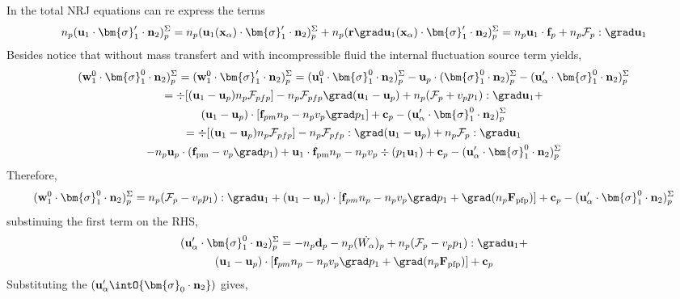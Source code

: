In the total NRJ equations can re express the terms 
\begin{multline*}
    n_p (\textbf{u}_1 \cdot \bm{\sigma}_1' \cdot  \textbf{n}_2)^\Sigma_p
    = 
    n_p (\textbf{u}_1(\textbf{x}_\alpha) \cdot \bm{\sigma}_1' \cdot  \textbf{n}_2)^\Sigma_p
    + n_p (\textbf{r}\grad\textbf{u}_1(\textbf{x}_\alpha) \cdot \bm{\sigma}_1' \cdot  \textbf{n}_2)^\Sigma_p
    =n_p \textbf{u}_1 \cdot \textbf{f}_p
    + n_p \mathcal{F}_p :\grad \textbf{u}_1
\end{multline*}
Besides notice that without mass transfert and with incompressible fluid the internal fluctuation source term yields,
\begin{multline*}
    (\textbf{w}_1^0 \cdot \bm{\sigma}_1^0 \cdot  \textbf{n}_2)^\Sigma_p
    =   
    (\textbf{w}_1^0 \cdot \bm{\sigma}_1' \cdot  \textbf{n}_2)^\Sigma_p
    =   
    (\textbf{u}_1^0 \cdot \bm{\sigma}_1^0 \cdot  \textbf{n}_2)^\Sigma_p
    - \textbf{u}_p \cdot (\bm{\sigma}_1^0 \cdot  \textbf{n}_2)^\Sigma_p
    - (\textbf{u}_\alpha' \cdot \bm{\sigma}_1^0 \cdot  \textbf{n}_2)^\Sigma_p\\
    =   
    \div [(\textbf{u}_1 - \textbf{u}_p) n_p \mathcal{F}_{pfp}]
    - n_p \mathcal{F}_{pfp} \grad (\textbf{u}_1 - \textbf{u}_p)
    +n_p(\mathcal{F}_p + v_p p_1): \grad \textbf{u}_1+\\
    (\textbf{u}_1 - \textbf{u}_p) \cdot [\textbf{f}_{pm}n_p - n_pv_p\grad p_1]
    + \textbf{c}_p
    - (\textbf{u}_\alpha' \cdot \bm{\sigma}_1^0 \cdot  \textbf{n}_2)^\Sigma_p\\
    =   
    \div [(\textbf{u}_1 - \textbf{u}_p) n_p \mathcal{F}_{pfp}]
    - n_p \mathcal{F}_{pfp} : \grad (\textbf{u}_1 - \textbf{u}_p)
    + n_p \mathcal{F}_p : \grad \textbf{u}_1\\
    - n_p \textbf{u}_p \cdot (\textbf{f}_\text{pm} - v_p\grad p_1)
    + \textbf{u}_1  \cdot \textbf{f}_\text{pm}n_p 
    - n_pv_p \div (p_1 \textbf{u}_1)
    + \textbf{c}_p
    - (\textbf{u}_\alpha' \cdot \bm{\sigma}_1^0 \cdot  \textbf{n}_2)^\Sigma_p\\
\end{multline*}
Therefore, 
\begin{equation}
    (\textbf{w}_1^0 \cdot \bm{\sigma}_1^0 \cdot  \textbf{n}_2)^\Sigma_p
    =   
    n_p(\mathcal{F}_p - v_p p_1): \grad \textbf{u}_1+
    (\textbf{u}_1 - \textbf{u}_p) \cdot [\textbf{f}_{pm}n_p - n_pv_p\grad p_1+\grad (n_p \textbf{F}_\text{pfp})] 
    + \textbf{c}_p
    - (\textbf{u}_\alpha' \cdot \bm{\sigma}_1^0 \cdot  \textbf{n}_2)^\Sigma_p\\
\end{equation}
substinuing the first term on the RHS,
\begin{multline}
    (\textbf{u}_\alpha' \cdot \bm{\sigma}_1^0 \cdot  \textbf{n}_2)^\Sigma_p
    =   
    - n_p\textbf{d}_p
    - n_p(\dot{W_\alpha})_p
    + n_p(\mathcal{F}_p - v_p p_1): \grad \textbf{u}_1+\\
    (\textbf{u}_1 - \textbf{u}_p) \cdot [\textbf{f}_{pm}n_p - n_pv_p\grad p_1+\grad (n_p \textbf{F}_\text{pfp})] 
    + \textbf{c}_p
\end{multline}
Substituting the $(\textbf{u}'_\alpha \intO{\bm{\sigma}_0 \cdot \textbf{n}_2})$ gives, 


